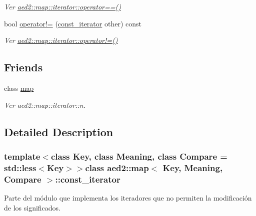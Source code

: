 \begin{DoxyCompactItemize}
\begin{DoxyCompactList}\small\item\em \-Ver \hyperlink{classaed2_1_1map_1_1iterator_ad052c1ef8477a1613c292202226053a5}{aed2\-::map\-::iterator\-::operator==()} \end{DoxyCompactList}\item 
\hypertarget{classaed2_1_1map_1_1const__iterator_a40b9e921ad9c25aded17f394b9534510}{bool \hyperlink{classaed2_1_1map_1_1const__iterator_a40b9e921ad9c25aded17f394b9534510}{operator!=} (\hyperlink{classaed2_1_1map_1_1const__iterator}{const\-\_\-iterator} other) const }\label{classaed2_1_1map_1_1const__iterator_a40b9e921ad9c25aded17f394b9534510}

\begin{DoxyCompactList}\small\item\em \-Ver \hyperlink{classaed2_1_1map_1_1iterator_a836c7a166d63f507c4f79085ae953c51}{aed2\-::map\-::iterator\-::operator!=()} \end{DoxyCompactList}\end{DoxyCompactItemize}
\subsection*{\-Friends}
\begin{DoxyCompactItemize}
\item 
\hypertarget{classaed2_1_1map_1_1const__iterator_aeda338414e516b47761f994fb78056c6}{class \hyperlink{classaed2_1_1map_1_1const__iterator_aeda338414e516b47761f994fb78056c6}{map}}\label{classaed2_1_1map_1_1const__iterator_aeda338414e516b47761f994fb78056c6}

\begin{DoxyCompactList}\small\item\em \-Ver aed2\-::map\-::iterator\-::n. \end{DoxyCompactList}\end{DoxyCompactItemize}


\subsection{\-Detailed \-Description}
\subsubsection*{template$<$class \-Key, class \-Meaning, class \-Compare = std\-::less$<$\-Key$>$$>$class aed2\-::map$<$ Key, Meaning, Compare $>$\-::const\-\_\-iterator}

\-Parte del módulo que implementa los iteradores que no permiten la modificación de los significados. 

